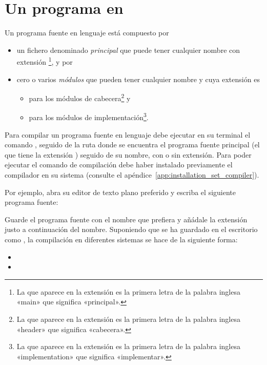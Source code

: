 	\section{Un programa en \Set}

		Un programa fuente en lenguaje \Set está compuesto por
		\begin{itemize}
			\item un fichero denominado \emph{principal} que puede tener cualquier nombre con extensión \footnote
			{
				La  que aparece en la extensión  es la primera letra de la palabra inglesa «main» que significa «principal». 
			},
			y por

			\item cero o varios \emph{módulos} que pueden tener cualquier nombre y cuya extensión es
			\begin{itemize}
				\item {} para los módulos de cabecera\footnote
				{
					La  que aparece en la extensión  es la primera letra de la palabra inglesa «header» que significa «cabecera». 
				}
				y 

				\item {} para los módulos de implementación\footnote
				{
					La  que aparece en la extensión  es la primera letra de la palabra inglesa «implementation» que significa «implementar». 
				}.
			\end{itemize}
		\end{itemize}

		Para compilar un programa fuente en lenguaje \Set debe ejecutar en su terminal el comando , seguido de la ruta donde se encuentra el programa fuente principal (el que tiene la extensión ) seguido de su nombre, con o sin extensión. Para poder ejecutar el comando de compilación  debe haber instalado previamente el compilador \Set en su sistema (consulte el apéndice~\ref{app:installation_set_compiler}).

		Por ejemplo, abra su editor de texto plano preferido y escriba el siguiente programa fuente:
		
		
		Guarde el programa fuente con el nombre que prefiera y añádale la extensión  justo a continuación del nombre. Suponiendo que se ha guardado en el escritorio como , la compilación en diferentes sistemas se hace de la siguiente forma:
		\begin{itemize}
			\item %

			\item %
		\end{itemize}

